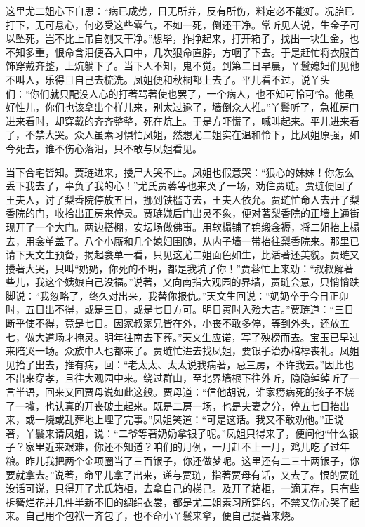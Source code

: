 \begin{parag}


    这里尤二姐心下自思：“病已成势，日无所养，反有所伤，料定必不能好。况胎已打下，无可悬心，何必受这些零气，不如一死，倒还干净。常听见人说，生金子可以坠死，岂不比上吊自刎又干净。”想毕，拃挣起来，打开箱子，找出一块生金，也不知多重，恨命含泪便吞入口中，几次狠命直脖，方咽了下去。于是赶忙将衣服首饰穿戴齐整，上炕躺下了。当下人不知，鬼不觉。到第二日早晨，丫鬟媳妇们见他不叫人，乐得且自己去梳洗。凤姐便和秋桐都上去了。平儿看不过，说丫头们：“你们就只配没人心的打著骂著使也罢了，一个病人，也不知可怜可怜。他虽好性儿，你们也该拿出个样儿来，别太过逾了，墙倒众人推。”丫鬟听了，急推房门进来看时，却穿戴的齐齐整整，死在炕上。于是方吓慌了，喊叫起来。平儿进来看了，不禁大哭。众人虽素习惧怕凤姐，然想尤二姐实在温和怜下，比凤姐原强，如今死去，谁不伤心落泪，只不敢与凤姐看见。
\end{parag}


\begin{parag}


    当下合宅皆知。贾琏进来，搂尸大哭不止。凤姐也假意哭：“狠心的妹妹！你怎么丢下我去了，辜负了我的心！”尤氏贾蓉等也来哭了一场，劝住贾琏。贾琏便回了王夫人，讨了梨香院停放五日，挪到铁槛寺去，王夫人依允。贾琏忙命人去开了梨香院的门，收拾出正房来停灵。贾琏嫌后门出灵不象，便对著梨香院的正墙上通街现开了一个大门。两边搭棚，安坛场做佛事。用软榻铺了锦缎衾褥，将二姐抬上榻去，用衾单盖了。八个小厮和几个媳妇围随，从内子墙一带抬往梨香院来。那里已请下天文生预备，揭起衾单一看，只见这尤二姐面色如生，比活著还美貌。贾琏又搂著大哭，只叫“奶奶，你死的不明，都是我坑了你！”贾蓉忙上来劝：“叔叔解著些儿，我这个姨娘自己没福。”说著，又向南指大观园的界墙，贾琏会意，只悄悄跌脚说：“我忽略了，终久对出来，我替你报仇。”天文生回说：“奶奶卒于今日正卯时，五日出不得，或是三日，或是七日方可。明日寅时入殓大吉。”贾琏道：“三日断乎使不得，竟是七日。因家叔家兄皆在外，小丧不敢多停，等到外头，还放五七，做大道场才掩灵。明年往南去下葬。”天文生应诺，写了殃榜而去。宝玉已早过来陪哭一场。众族中人也都来了。贾琏忙进去找凤姐，要银子治办棺椁丧礼。凤姐见抬了出去，推有病，回：“老太太、太太说我病著，忌三房，不许我去。”因此也不出来穿孝，且往大观园中来。绕过群山，至北界墙根下往外听，隐隐绰绰听了一言半语，回来又回贾母说如此这般。贾母道：“信他胡说，谁家痨病死的孩子不烧了一撒，也认真的开丧破土起来。既是二房一场，也是夫妻之分，停五七日抬出来，或一烧或乱葬地上埋了完事。”凤姐笑道：“可是这话。我又不敢劝他。”正说著，丫鬟来请凤姐，说：“二爷等著奶奶拿银子呢。”凤姐只得来了，便问他“什么银子？家里近来艰难，你还不知道？咱们的月例，一月赶不上一月，鸡儿吃了过年粮。昨儿我把两个金项圈当了三百银子，你还做梦呢。这里还有二三十两银子，你要就拿去。”说著，命平儿拿了出来，递与贾琏，指著贾母有话，又去了。恨的贾琏没话可说，只得开了尤氏箱柜，去拿自己的梯己。及开了箱柜，一滴无存，只有些拆簪烂花并几件半新不旧的绸绢衣裳，都是尤二姐素习所穿的，不禁又伤心哭了起来。自己用个包袱一齐包了，也不命小丫鬟来拿，便自己提著来烧。
\end{parag}


